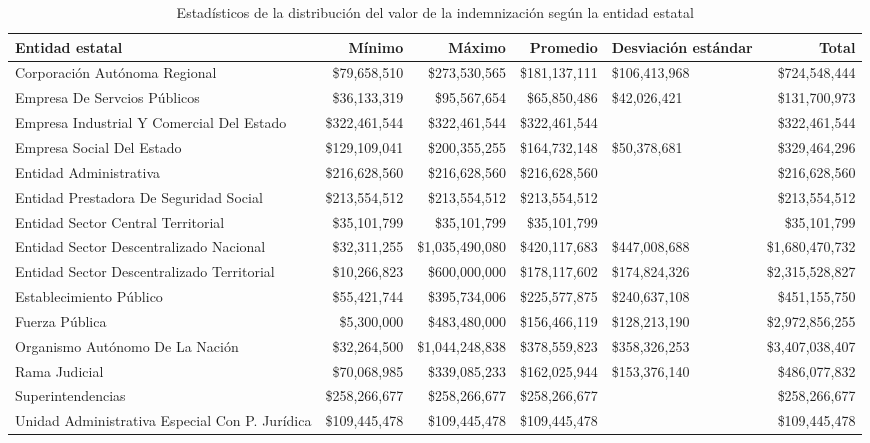 \begin{sidewaystable}[htbp]
\centering
\caption{Estadísticos de la distribución del
valor de la indemnización según la entidad estatal} 
\label{tab:indementidad}
\begin{tabular}{p{7cm}rrrR{2cm}r}
  \hline
Entidad estatal & Mínimo & Máximo & Promedio & Desviación estándar & Total \\ 
  \hline
Corporación Autónoma Regional & \$79,658,510 & \$273,530,565 & \$181,137,111 & \$106,413,968 & \$724,548,444 \\ 
  Empresa De Servcios Públicos & \$36,133,319 & \$95,567,654 & \$65,850,486 & \$42,026,421 & \$131,700,973 \\ 
  Empresa Industrial Y Comercial Del Estado & \$322,461,544 & \$322,461,544 & \$322,461,544 &  & \$322,461,544 \\ 
  Empresa Social Del Estado & \$129,109,041 & \$200,355,255 & \$164,732,148 & \$50,378,681 & \$329,464,296 \\ 
  Entidad Administrativa & \$216,628,560 & \$216,628,560 & \$216,628,560 &  & \$216,628,560 \\ 
  Entidad Prestadora De Seguridad Social & \$213,554,512 & \$213,554,512 & \$213,554,512 &  & \$213,554,512 \\ 
  Entidad Sector Central Territorial & \$35,101,799 & \$35,101,799 & \$35,101,799 &  & \$35,101,799 \\ 
  Entidad Sector Descentralizado Nacional & \$32,311,255 & \$1,035,490,080 & \$420,117,683 & \$447,008,688 & \$1,680,470,732 \\ 
  Entidad Sector Descentralizado Territorial & \$10,266,823 & \$600,000,000 & \$178,117,602 & \$174,824,326 & \$2,315,528,827 \\ 
  Establecimiento Público & \$55,421,744 & \$395,734,006 & \$225,577,875 & \$240,637,108 & \$451,155,750 \\ 
  Fuerza Pública & \$5,300,000 & \$483,480,000 & \$156,466,119 & \$128,213,190 & \$2,972,856,255 \\ 
  Organismo Autónomo De La Nación & \$32,264,500 & \$1,044,248,838 & \$378,559,823 & \$358,326,253 & \$3,407,038,407 \\ 
  Rama Judicial & \$70,068,985 & \$339,085,233 & \$162,025,944 & \$153,376,140 & \$486,077,832 \\ 
  Superintendencias & \$258,266,677 & \$258,266,677 & \$258,266,677 &  & \$258,266,677 \\ 
  Unidad Administrativa Especial Con P. Jurídica & \$109,445,478 & \$109,445,478 & \$109,445,478 &  & \$109,445,478 \\ 
   \hline
\end{tabular}
\end{sidewaystable}
